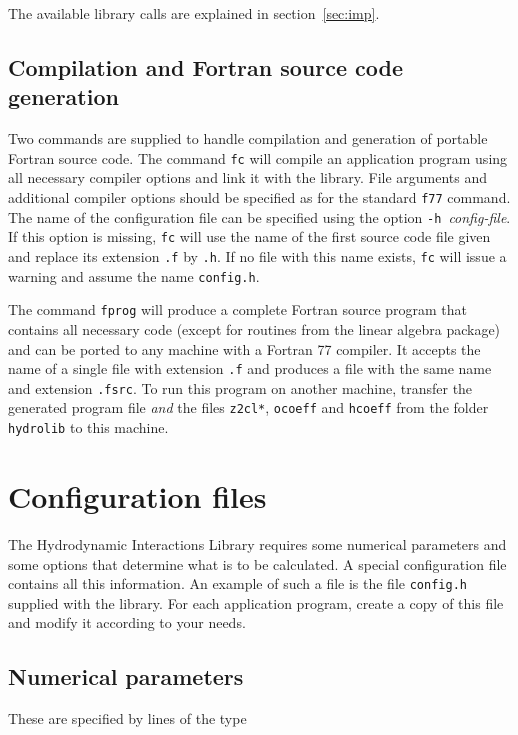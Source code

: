 \documentclass[12pt]{article}
\newcommand{\prog}[1]{{\tt #1}}
\newcommand{\wsp}{\hspace*{0.5cm}}
\begin{document}
The available library calls are explained in section~\ref{sec:imp}.

\subsection{Compilation and Fortran source code generation}

Two commands are supplied to handle compilation and generation of
portable Fortran source code.  The command \prog{fc} will compile an
application program using all necessary compiler options and link it
with the library. File arguments and additional compiler options
should be specified as for the standard \prog{f77} command. The
name of the configuration file can be specified using the option
\prog{-h}~{\em config-file}\/. If this option is missing, \prog{fc}
will use the name of the first source code file given and
replace its extension \prog{.f} by \prog{.h}. If no file with
this name exists, \prog{fc} will issue a warning and assume
the name \prog{config.h}.

The command \prog{fprog} will produce a complete Fortran source
program that contains all necessary code (except for routines from the
linear algebra package) and can be ported to any machine with a
Fortran 77 compiler. It accepts the name of a single file with
extension \prog{.f} and produces a file with the same name and
extension \prog{.fsrc}. To run this program on another machine,
transfer the generated program file {\em and} the files \prog{z2cl*},
\prog{ocoeff} and \prog{hcoeff} from the folder \prog{hydrolib}
to this machine. 

\section{Configuration files}
\label{sec:config}

The Hydrodynamic Interactions Library requires some numerical parameters
and some options that determine what is to be calculated. A special
configuration file contains all this information. An example of such
a file is the file \prog{config.h} supplied with the library. For each
application program, create a copy of this file and modify it according
to your needs.

\subsection{Numerical parameters}

These are specified by lines of the type\\
\wsp\prog{\#define }{\em parameter\_name value}
\end{document}
